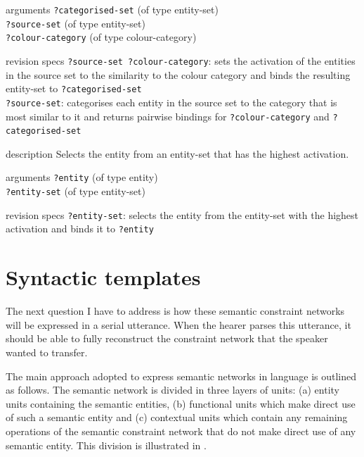 \begin{explanation}{arguments}
\verb+?categorised-set+ (of type entity-set) \\
\verb+?source-set+ (of type entity-set) \\
\verb+?colour-category+ (of type colour-category)
\end{explanation}

\begin{explanation}{revision specs}
  \verb+?source-set ?colour-category+: sets the activation of the
  entities in the source set to the similarity to the colour category
  and binds the resulting entity-set to \verb+?categorised-set+ \\
  \verb+?source-set+: categorises each entity in the source set to the
  category that is most similar to it and returns pairwise bindings
  for \verb+?colour-category+ and \verb+?categorised-set+
\end{explanation}


\begin{explanation}{description}
Selects the entity from an entity-set that has the highest activation.
\end{explanation}

\begin{explanation}{arguments}
\verb+?entity+ (of type entity) \\
\verb+?entity-set+ (of type entity-set)
\end{explanation}

\begin{explanation}{revision specs}
\verb+?entity-set+: selects the entity from the entity-set with the highest activation and binds it to \verb+?entity+
\end{explanation}

\section{Syntactic templates}
\label{s:bcs-syntactic-templates}

The next question I have to address is how these semantic constraint
networks will be expressed in a serial utterance. When the hearer
parses this utterance, it should be able to fully reconstruct the
constraint network that the speaker wanted to transfer. 

The main approach adopted to express semantic networks in language is
outlined as follows. The semantic network is divided in three layers
of units: (a) entity units containing the semantic entities, (b)
functional units which make direct use of such a semantic entity and
(c) contextual units which contain any remaining operations of the
semantic constraint network that do not make direct use of any
semantic entity. This division is illustrated in .

